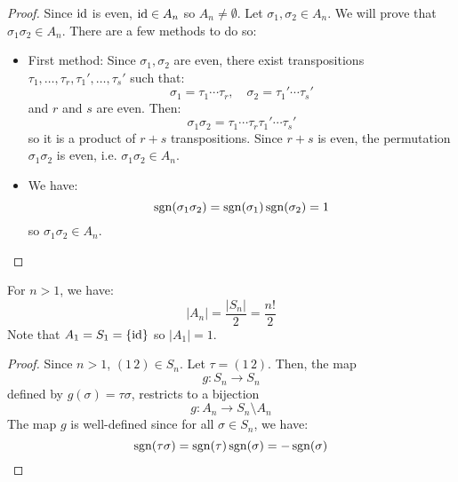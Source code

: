 \begin{itemize}
\begin{proof}
        Since $\text{id}$ is even, $\text{id} \in A_n$ so $A_n \neq \emptyset$. Let $\sigma_1,\sigma_2 \in A_n$. We will prove that $\sigma_1\sigma_2 \in A_n$. There are a few methods to do so:
        \begin{itemize}
            \item First method: Since $\sigma_1,\sigma_2$ are even, there exist transpositions $\tau_1,\dots,\tau_r,\tau_1',\dots,\tau_s'$ such that:
            \begin{equation}
                \sigma_1=\tau_1\cdots\tau_r,\quad \sigma_2 = \tau_1'\cdots \tau_s'
            \end{equation}
            and $r$ and $s$ are even. Then:
            \begin{equation}
                \sigma_1\sigma_2 = \tau_1\cdots\tau_r\tau_1'\cdots\tau_s'
            \end{equation}
            so it is a product of $r+s$ transpositions. Since $r+s$ is even, the permutation $\sigma_1\sigma_2$ is even, i.e. $\sigma_1\sigma_2 \in A_n$.
            \item We have:
            \begin{equation}
                \operatorname{sgn}(\sigma_1\sigma_2)=\operatorname{sgn}(\sigma_1)\operatorname{sgn}(\sigma_2) = 1
            \end{equation}
            so $\sigma_1\sigma_2\in A_n$.
        \end{itemize}
    \end{proof}
    \begin{proposition}
        For $n>1$, we have:
        \begin{equation}
            |A_n| = \frac{|S_n|}{2} = \frac{n!}{2}
        \end{equation}
        Note that $A_1=S_1=\{\text{id}\}$ so $|A_1|=1$.
    \end{proposition}
    \begin{proof}
        Since $n>1$, $(1\,2)\in S_n$. Let $\tau=(1\,2)$. Then, the map
        \begin{equation}
            g:S_n \rightarrow S_n
        \end{equation}
        defined by $g(\sigma)=\tau\sigma$, restricts to a bijection
        \begin{equation}
            g:A_n \rightarrow S_n \setminus A_n
        \end{equation}
        The map $g$ is well-defined since for all $\sigma \in S_n$, we have:
        \begin{equation}
            \sgn(\tau\sigma)=\sgn(\tau)\sgn(\sigma)=-\sgn(\sigma)

\end{equation}
\end{proof}
\end{itemize}

